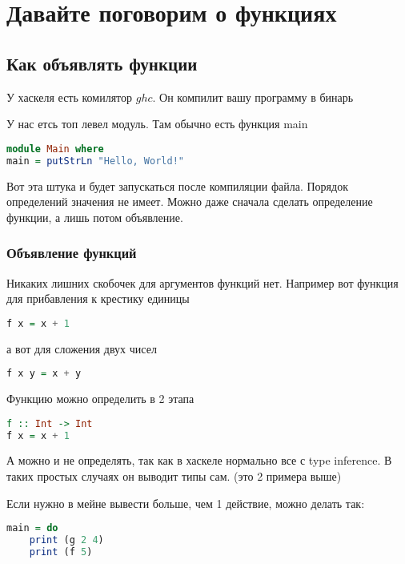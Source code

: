 \documentclass[10pt, a4paper]{article}
\begin{document}
\section{Давайте поговорим о функциях}

\subsection{Как объявлять функции}

У хаскеля есть комилятор $ghc$. Он компилит вашу программу в бинарь

У нас етсь топ левел модуль. Там обычно есть функция main

\begin{lstlisting}[language=haskell]
module Main where
main = putStrLn "Hello, World!"
\end{lstlisting}

Вот эта штука и будет запускаться после компиляции файла. Порядок определений значения не имеет. Можно даже сначала сделать определение функции, а лишь потом объявление.

\subsubsection{Объявление функций}
Никаких лишних скобочек для аргументов функций нет. Например вот функция для прибавления к крестику единицы

\begin{lstlisting}[language=haskell]
f x = x + 1
\end{lstlisting}

а вот для сложения двух чисел

\begin{lstlisting}[language=haskell]
f x y = x + y
\end{lstlisting} 

Функцию можно определить в 2 этапа

\begin{lstlisting}[language=haskell]
f :: Int -> Int
f x = x + 1
\end{lstlisting}

А можно и не определять, так как в хаскеле нормально все с type inference. В таких простых случаях он выводит типы сам. (это 2 примера выше)

Если нужно в мейне вывести больше, чем 1 действие, можно делать так:

\begin{lstlisting}[language=haskell]
main = do 
    print (g 2 4)
    print (f 5)
\end{lstlisting}
\end{document}
